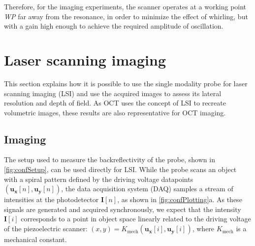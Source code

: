 \documentclass[10pt]{iopart}
\begin{document}
Therefore, for the imaging experiments, the scanner operates at a working point \textit{WP} far away from the resonance, in order to minimize the effect of whirling, but with a gain high enough to achieve the required amplitude of oscillation.


\section{Laser scanning imaging}
This section explains how it is possible to use the single modality probe for laser scanning imaging (LSI) and use the acquired images to assess its lateral resolution and depth of field. As OCT uses the concept of LSI to recreate volumetric images, these results are also representative for OCT imaging.

\subsection{Imaging}
The setup used to measure the backreflectivity of the probe, shown in \autoref{fig:confSetup}, can be used directly for LSI. While the probe scans an object with a spiral pattern defined by the driving voltage datapoints $(\mathbf{u_x}[n], \mathbf{u_y}[n])$, the data acquisition system (DAQ) samples a stream of intensities at the photodetector $\mathbf{I}[n]$, as shown in \autoref{fig:confPlotting}a. As these signals are generated and acquired synchronously, we expect that the intensity $\mathbf{I}[i]$ corresponds to a point in object space linearly related to the driving voltage of the piezoelectric scanner: $(x, y) = K_\mathrm{mech}(\mathbf{u_x}[i], \mathbf{u_y}[i])$, where $K_\mathrm{mech}$ is a mechanical constant.
\end{document}
